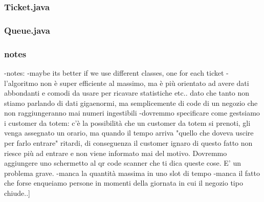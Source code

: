 
\subsubsection*{Ticket.java}
\label{subsubsect:ticketjava}


\subsubsection*{Queue.java}
\label{subsubsect:queuejava}


\subsubsection{notes}
\label{subsubsect:notes}

-notes: 
    -maybe its better if we use different classes, one for each ticket
    -l'algoritmo non è super efficiente al massimo, ma è più orientato ad avere dati abbondanti e comodi da usare per ricavare statistiche etc.. dato che tanto non stiamo parlando di dati gigaenormi, ma semplicemente di code di un negozio che non raggiungeranno mai numeri ingestibili
    -dovremmo specificare come gestsiamo i customer da totem: c'è la possibilità che un customer da totem si prenoti, gli venga assegnato un orario, ma quando il tempo arriva "quello che doveva uscire per farlo entrare" ritardi, di conseguenza il customer ignaro di questo fatto non riesce più ad entrare e non viene informato mai del motivo. Dovremmo aggiungere uno schermetto al qr code scanner che ti dica queste cose. E' un problema grave.
    -manca la quantità massima in uno slot di tempo
    -manca il fatto che forse enqueiamo persone in momenti della giornata in cui il negozio tipo chiude..]